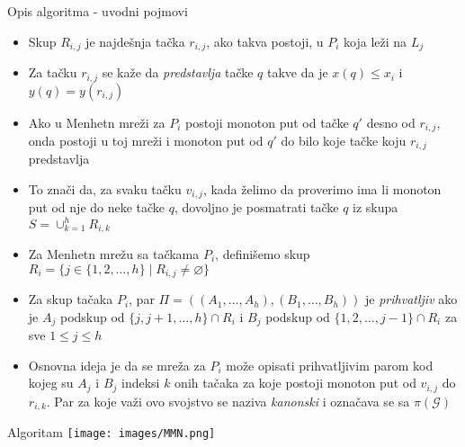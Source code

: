 \documentclass[10pt]{beamer}
\begin{document}
\begin{frame}{Opis algoritma - uvodni pojmovi}
    \begin{itemize}
    \item Skup $R_{i, j}$ je najdešnja tačka $r_{i, j}$, ako takva postoji, u $P_i$ koja leži na $L_j$
    \item Za tačku $r_{i, j}$ se kaže da \textit{predstavlja} tačke $q$ takve da je $x(q) \leq x_i$ i $y(q) = y(r_{i, j})$
    \item Ako u Menhetn mreži za $P_i$ postoji monoton put od tačke $q'$ desno od $r_{i, j}$, onda postoji u toj mreži i monoton put od $q'$ do bilo koje tačke koju $r_{i, j}$ predstavlja
    \item To znači da, za svaku tačku $v_{i, j}$, kada želimo da proverimo ima li monoton put od nje do neke tačke $q$, dovoljno je posmatrati tačke $q$ iz skupa $S = \cup_{k = 1}^{h} R_{i, k}$
    \item Za Menhetn mrežu sa tačkama $P_i$, definišemo skup $R_i = \{ j \in \{1, 2, \dots, h\} \mid R_{i, j} \neq \varnothing \}$
    \item Za skup tačaka $P_i$, par $\Pi = ((A_1, \dots, A_h), (B_1, \dots, B_h))$ je \textit{prihvatljiv} ako je $A_j$ podskup od $\{j, j+1, \dots, h\} \cap R_i$ i $B_j$ podskup od $\{1, 2, \dots, j-1\} \cap R_i$ za sve $1 \leq j \leq h$
    \item Osnovna ideja je da se mreža za $P_i$ može opisati prihvatljivim parom kod kojeg su $A_j$ i $B_j$ indeksi $k$ onih tačaka za koje postoji monoton put od $v_{i, j}$ do $r_{i, k}$. Par za koje važi ovo svojstvo se naziva \textit{kanonski} i označava se sa $\pi(\mathcal{G})$
    \end{itemize}
\end{frame}

\begin{frame}{Algoritam}
    \texttt{[image: images/MMN.png]}
    \centering
\end{frame}
\end{document}
